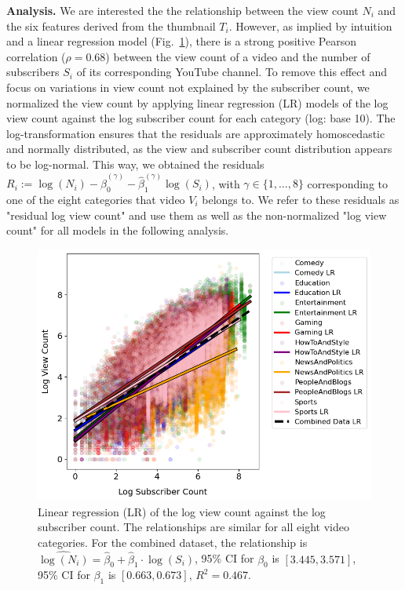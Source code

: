 \documentclass{article}
\begin{document}
\textbf{Analysis.} We are interested the the relationship between the view count $N_i$ and the six features derived from the thumbnail $T_i$. However, as implied by intuition and a linear regression model (Fig.~\ref{fig:subscriber}), there is a strong positive Pearson correlation ($\rho=0.68$) between the view count of a video and the number of subscribers $S_i$ of its corresponding YouTube channel. To remove this effect and focus on variations in view count not explained by the subscriber count, we normalized the view count by applying linear regression (LR) models of the log view count against the log subscriber count for each category (log: base 10). The log-transformation ensures that the residuals are approximately homoscedastic and normally distributed, as the view and subscriber count distribution appears to be log-normal. This way, we obtained the residuals $R_{i} := \log(N_i) - \hat{\beta}_0^{(\gamma)} - \hat{\beta}_1^{(\gamma)} \log(S_i)$, with $\gamma \in \{1,..., 8\}$ corresponding to one of the eight categories that video $V_i$ belongs to. We refer to these residuals as "residual log view count" and use them as well as the non-normalized "log view count" for all models in the following analysis.


\begin{figure}[h]
  \begin{minipage}[t]{0.67\textwidth}
    \vspace{0pt}  %
    \includegraphics[width=\textwidth]{figs/subscriber.png}
  \end{minipage}%
  \hspace{0.05\textwidth}%
  \begin{minipage}[t]{0.27\textwidth}
    \vspace{0pt}  %
    \caption{Linear regression (LR) of the log view count against the log subscriber count. The relationships are similar for all eight video categories. For the combined dataset, the relationship is $\widehat{\log(N_i)} = \hat{\beta}_0 + \hat{\beta}_1 \cdot \log(S_i)$, 95\% CI for $\beta_0$ is $[3.445, 3.571]$, 95\% CI for $\beta_1$ is $[0.663, 0.673]$, $R^2 = 0.467$.}
    \label{fig:subscriber}
  \end{minipage}
\end{figure}
\end{document}

